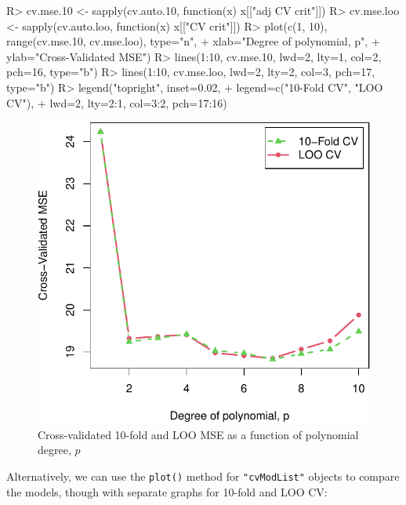 \documentclass[
]{jss}
\begin{document}
\begin{CodeChunk}
\begin{CodeInput}
R> cv.mse.10 <- sapply(cv.auto.10, function(x) x[["adj CV crit"]])
R> cv.mse.loo <- sapply(cv.auto.loo, function(x) x[["CV crit"]])
R> plot(c(1, 10), range(cv.mse.10, cv.mse.loo), type="n",
+      xlab="Degree of polynomial, p",
+      ylab="Cross-Validated MSE")
R> lines(1:10, cv.mse.10, lwd=2, lty=1, col=2, pch=16, type="b")
R> lines(1:10, cv.mse.loo, lwd=2, lty=2, col=3, pch=17, type="b")
R> legend("topright", inset=0.02,
+        legend=c("10-Fold CV", "LOO CV"),
+        lwd=2, lty=2:1, col=3:2, pch=17:16)
\end{CodeInput}
\begin{figure}

{\centering \includegraphics[width=1\linewidth]{JSS-article_files/figure-latex/polynomial-regression-CV-graph-1} 

}

\caption[Cross-validated 10-fold and LOO MSE as a function of polynomial degree, $p$]{Cross-validated 10-fold and LOO MSE as a function of polynomial degree, $p$}\label{fig:polynomial-regression-CV-graph}
\end{figure}
\end{CodeChunk}

Alternatively, we can use the \texttt{plot()} method for
\texttt{"cvModList"} objects to compare the models, though with separate
graphs for 10-fold and LOO CV:
\end{document}

